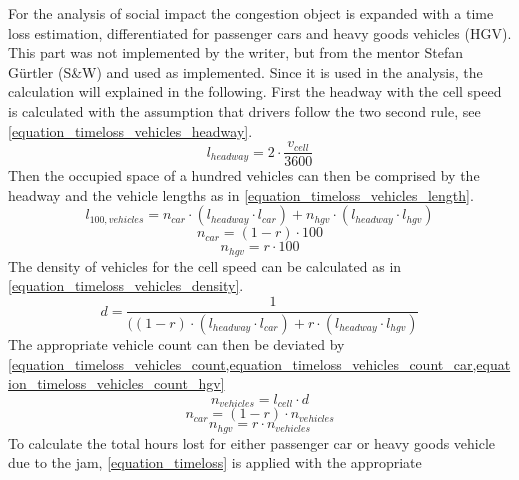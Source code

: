 For the analysis of social impact the congestion object is expanded with a time loss estimation, differentiated for passenger cars and heavy goods vehicles (HGV). This part was not implemented by the writer, but from the mentor Stefan Gürtler (S\&W) and used as implemented. Since it is used in the analysis, the calculation will explained in the following. First the headway with the cell speed is calculated with the assumption that drivers follow the two second rule, see \cref{equation_timeloss_vehicles_headway}.
\begin{equation}
	l_{headway} = 2 \cdot \frac{v_{cell}}{3600}
	\label{equation_timeloss_vehicles_headway}
\end{equation}
Then the occupied space of a hundred vehicles can then be comprised by the headway and the vehicle lengths as in \cref{equation_timeloss_vehicles_length}.
\begin{equation}
	l_{100,vehicles} = n_{car} \cdot (l_{headway} \cdot l_{car}) + n_{hgv} \cdot (l_{headway} \cdot l_{hgv})
	\label{equation_timeloss_vehicles_length}
\end{equation}
\begin{equation}
	n_{car} = (1-r) \cdot 100
\end{equation}
\begin{equation}
	n_{hgv} = r \cdot 100 
\end{equation}
The density of vehicles for the cell speed can be calculated as in \cref{equation_timeloss_vehicles_density}.
\begin{equation}
	d = \frac{1}{((1-r) \cdot (l_{headway} \cdot l_{car}) + r \cdot (l_{headway} \cdot l_{hgv})}
	\label{equation_timeloss_vehicles_density}
\end{equation}
The appropriate vehicle count can then be deviated by \cref{equation_timeloss_vehicles_count,equation_timeloss_vehicles_count_car,equation_timeloss_vehicles_count_hgv}
\begin{equation}
	n_{vehicles} = l_{cell} \cdot d
	\label{equation_timeloss_vehicles_count}
\end{equation}
\begin{equation}
	n_{car} = (1-r) \cdot n_{vehicles}
	\label{equation_timeloss_vehicles_count_car}
\end{equation}
\begin{equation}
	n_{hgv} = r \cdot n_{vehicles}
	\label{equation_timeloss_vehicles_count_hgv}
\end{equation}
To calculate the total hours lost for either passenger car or heavy goods vehicle due to the jam, \cref{equation_timeloss} is applied with the appropriate 
